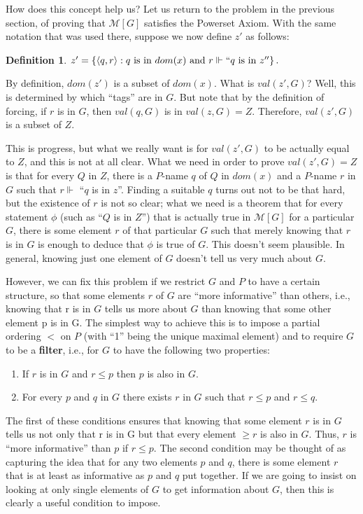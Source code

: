 \documentclass[10pt]{article}
\theoremstyle{definition}
\newtheorem*{defn}{Definition}
\begin{document}
How does this concept help us? Let us return to the problem in the previous section, of proving that $\mathcal M[G]$ satisfies the Powerset Axiom. With the same notation that was used there, suppose we now define $z'$ as follows:

\begin{defn}
$z' = \left\{\langle q,r\rangle : q\text{ is in }dom(x)\text{ and }r \Vdash ``q\text{ is in }z''\right\}.$
\end{defn}

By definition, $dom(z')$ is a subset of $dom(x)$. What is $val(z',G)$? Well, this is determined by which ``tags'' are in $G$. But note that by the definition of forcing, if $r$ is in $G$, then $val(q,G)$ is in $val(z,G) = Z$. Therefore, $val(z',G)$ is a subset of $Z$.

This is progress, but what we really want is for $val(z',G)$ to be actually equal to $Z$, and this is not at all clear. What we need in order to prove $val(z',G) = Z$ is that for every $Q$ in $Z$, there is a $P$-name $q$ of $Q$ in $dom(x)$ and a $P$-name $r$ in $G$ such that $r \Vdash$ ``$q$ is in $z$''. Finding a suitable $q$ turns out not to be that hard, but the existence of $r$ is not so clear; what we need is a theorem that for every statement $\phi$ (such as ``$Q$ is in $Z$'') that is actually true in $\mathcal M[G]$ for a particular $G$, there is some element $r$ of that particular $G$ such that merely knowing that $r$ is in $G$ is enough to deduce that $\phi$ is true of $G$. This doesn't seem plausible. In general, knowing just one element of $G$ doesn't tell us very much about $G$.

However, we can fix this problem if we restrict $G$ and $P$ to have a certain structure, so that some elements $r$ of $G$ are ``more informative'' than others, i.e., knowing that r is in $G$ tells us more about $G$ than knowing that some other element p is in G. The simplest way to achieve this is to impose a partial ordering $<$ on $P$ (with ``1'' being the unique maximal element) and to require $G$ to be a \textbf{filter}, i.e., for $G$ to have the following two properties:

\begin{enumerate}
\item If $r$ is in $G$ and $r \leq p$ then $p$ is also in $G$.
\item For every $p$ and $q$ in $G$ there exists $r$ in $G$ such that $r \leq p$ and $r \leq q$.
\end{enumerate}

The first of these conditions ensures that knowing that some element $r$ is in $G$ tells us not only that r is in G but that every element $\geq r$ is also in $G$. Thus, $r$ is ``more informative'' than $p$ if $r \leq p$. The second condition may be thought of as capturing the idea that for any two elements $p$ and $q$, there is some element $r$ that is at least as informative as $p$ and $q$ put together. If we are going to insist on looking at only single elements of $G$ to get information about $G$, then this is clearly a useful condition to impose.
\end{document}
